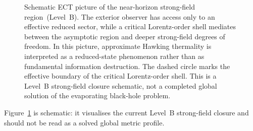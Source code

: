\begin{figure}[h]
\centering
{}
\caption{Schematic ECT picture of the near-horizon strong-field region~(Level~B).
The exterior observer has access only to an effective reduced sector, while a
critical Lorentz-order shell mediates between the asymptotic region and deeper
strong-field degrees of freedom.
In this picture, approximate Hawking thermality is interpreted as a reduced-state
phenomenon rather than as fundamental information destruction.
The dashed circle marks the effective boundary of the critical Lorentz-order shell.
This is a Level~B strong-field closure schematic, not a completed global solution
of the evaporating black-hole problem.}
\label{fig:qs_bh_shell}
\end{figure}

Figure~\ref{fig:qs_bh_shell} is schematic: it visualises the current
Level~B strong-field closure and should not be read as a solved global
metric profile.

